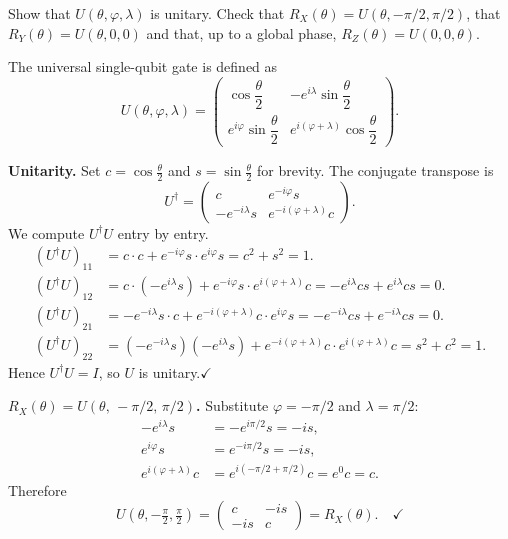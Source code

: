 \documentclass{ceri/sty/rapport}
\newcounter{exercice}[section]
\begin{document}
\begin{exercice}[p.~22]
Show that $U(\theta,\varphi,\lambda)$ is unitary.
Check that $R_X(\theta) = U(\theta,-\pi/2,\pi/2)$, that
$R_Y(\theta) = U(\theta,0,0)$ and that, up to a global phase,
$R_Z(\theta) = U(0,0,\theta)$.
\end{exercice}

\begin{solution}
The universal single-qubit gate is defined as
\[
  U(\theta,\varphi,\lambda)
  =\begin{pmatrix}
      \cos\dfrac{\theta}{2} & -e^{i\lambda}\sin\dfrac{\theta}{2}\\[8pt]
      e^{i\varphi}\sin\dfrac{\theta}{2} & e^{i(\varphi+\lambda)}\cos\dfrac{\theta}{2}
   \end{pmatrix}.
\]

\medskip\noindent
\textbf{Unitarity.}
Set $c=\cos\tfrac{\theta}{2}$ and $s=\sin\tfrac{\theta}{2}$ for brevity.
The conjugate transpose is
\[
  U^\dagger
  =\begin{pmatrix}
      c           & e^{-i\varphi}s         \\[4pt]
      -e^{-i\lambda}s & e^{-i(\varphi+\lambda)}c
   \end{pmatrix}.
\]
We compute $U^\dagger U$ entry by entry.
\begin{align*}
  (U^\dagger U)_{11}
    &= c\cdot c + e^{-i\varphi}s\cdot e^{i\varphi}s
     = c^2+s^2 = 1.\\[4pt]
  (U^\dagger U)_{12}
    &= c\cdot(-e^{i\lambda}s) + e^{-i\varphi}s\cdot e^{i(\varphi+\lambda)}c
     = -e^{i\lambda}cs + e^{i\lambda}cs = 0.\\[4pt]
  (U^\dagger U)_{21}
    &= -e^{-i\lambda}s\cdot c + e^{-i(\varphi+\lambda)}c\cdot e^{i\varphi}s
     = -e^{-i\lambda}cs + e^{-i\lambda}cs = 0.\\[4pt]
  (U^\dagger U)_{22}
    &= (-e^{-i\lambda}s)(-e^{i\lambda}s) + e^{-i(\varphi+\lambda)}c\cdot e^{i(\varphi+\lambda)}c
     = s^2+c^2 = 1.
\end{align*}
Hence $U^\dagger U = I$, so $U$ is unitary.\quad$\checkmark$

\medskip\noindent
\textbf{$R_X(\theta) = U(\theta,\,-\pi/2,\,\pi/2)$.}
Substitute $\varphi=-\pi/2$ and $\lambda=\pi/2$:
\begin{align*}
  -e^{i\lambda}s &= -e^{i\pi/2}s = -is,\\
  e^{i\varphi}s  &= e^{-i\pi/2}s = -is,\\
  e^{i(\varphi+\lambda)}c &= e^{i(-\pi/2+\pi/2)}c = e^{0}c = c.
\end{align*}
Therefore
\[
  U(\theta,-\tfrac{\pi}{2},\tfrac{\pi}{2})
  = \begin{pmatrix}c & -is\\-is & c\end{pmatrix}
  = R_X(\theta).\quad\checkmark
\]


\end{solution}
\end{document}
